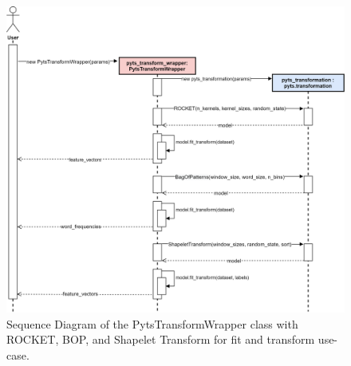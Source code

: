 \begin{figure}[ht]
    \centering
    \includegraphics[width=\textwidth]{gfx/pyts_transform_wrapper-Sequence.png}
    \caption{Sequence Diagram of the PytsTransformWrapper class with ROCKET, BOP, and Shapelet Transform for fit and transform use-case.}
    \label{fig:pyts-transform-wrapper-seq}
\end{figure}
